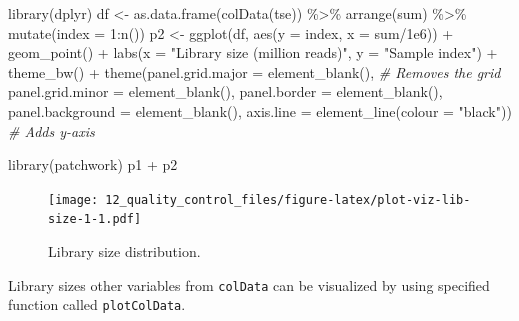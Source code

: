 \documentclass[
]{book}
\newenvironment{Shaded}{\begin{snugshade}}{\end{snugshade}}
\newcommand{\AttributeTok}[1]{\textcolor[rgb]{0.77,0.63,0.00}{#1}}
\newcommand{\CommentTok}[1]{\textcolor[rgb]{0.56,0.35,0.01}{\textit{#1}}}
\newcommand{\DecValTok}[1]{\textcolor[rgb]{0.00,0.00,0.81}{#1}}
\newcommand{\FloatTok}[1]{\textcolor[rgb]{0.00,0.00,0.81}{#1}}
\newcommand{\FunctionTok}[1]{\textcolor[rgb]{0.00,0.00,0.00}{#1}}
\newcommand{\NormalTok}[1]{#1}
\newcommand{\OtherTok}[1]{\textcolor[rgb]{0.56,0.35,0.01}{#1}}
\newcommand{\SpecialCharTok}[1]{\textcolor[rgb]{0.00,0.00,0.00}{#1}}
\newcommand{\StringTok}[1]{\textcolor[rgb]{0.31,0.60,0.02}{#1}}
\begin{document}
\begin{Shaded}
\begin{Highlighting}[]
\FunctionTok{library}\NormalTok{(dplyr)}
\NormalTok{df }\OtherTok{\textless{}{-}} \FunctionTok{as.data.frame}\NormalTok{(}\FunctionTok{colData}\NormalTok{(tse)) }\SpecialCharTok{\%\textgreater{}\%}
        \FunctionTok{arrange}\NormalTok{(sum) }\SpecialCharTok{\%\textgreater{}\%}
        \FunctionTok{mutate}\NormalTok{(}\AttributeTok{index =} \DecValTok{1}\SpecialCharTok{:}\FunctionTok{n}\NormalTok{())}
\NormalTok{p2 }\OtherTok{\textless{}{-}} \FunctionTok{ggplot}\NormalTok{(df, }\FunctionTok{aes}\NormalTok{(}\AttributeTok{y =}\NormalTok{ index, }\AttributeTok{x =}\NormalTok{ sum}\SpecialCharTok{/}\FloatTok{1e6}\NormalTok{)) }\SpecialCharTok{+}
        \FunctionTok{geom\_point}\NormalTok{() }\SpecialCharTok{+}  
        \FunctionTok{labs}\NormalTok{(}\AttributeTok{x =} \StringTok{"Library size (million reads)"}\NormalTok{, }\AttributeTok{y =} \StringTok{"Sample index"}\NormalTok{) }\SpecialCharTok{+}  
        \FunctionTok{theme\_bw}\NormalTok{() }\SpecialCharTok{+}
        \FunctionTok{theme}\NormalTok{(}\AttributeTok{panel.grid.major =} \FunctionTok{element\_blank}\NormalTok{(), }\CommentTok{\# Removes the grid}
          \AttributeTok{panel.grid.minor =} \FunctionTok{element\_blank}\NormalTok{(),}
          \AttributeTok{panel.border =} \FunctionTok{element\_blank}\NormalTok{(),}
          \AttributeTok{panel.background =} \FunctionTok{element\_blank}\NormalTok{(),}
          \AttributeTok{axis.line =} \FunctionTok{element\_line}\NormalTok{(}\AttributeTok{colour =} \StringTok{"black"}\NormalTok{)) }\CommentTok{\# Adds y{-}axis}

\FunctionTok{library}\NormalTok{(patchwork)}
\NormalTok{p1 }\SpecialCharTok{+}\NormalTok{ p2}
\end{Highlighting}
\end{Shaded}

\begin{figure}
\centering
\texttt{[image: 12\_quality\_control\_files/figure-latex/plot-viz-lib-size-1-1.pdf]}
\caption{\label{fig:plot-viz-lib-size-1}Library size distribution.}
\end{figure}

Library sizes other variables from \texttt{colData} can be
visualized by using specified function called \texttt{plotColData}.
\end{document}
